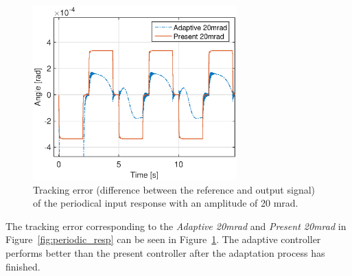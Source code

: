 \begin{figure}[h!]
  \centering
  \includegraphics[width=0.7\textwidth]{fig/matlab/trackingerror.eps}
  \caption{\label{fig:adapt_trackingerror} Tracking error (difference between the reference and output signal) of the periodical input response with an  amplitude of 20 mrad.}
\end{figure}

The tracking error corresponding to the \emph{Adaptive 20mrad} and \emph{Present 20mrad} in Figure~\ref{fig:periodic_resp} can be seen in Figure~\ref{fig:adapt_trackingerror}. The adaptive controller performs better than the present controller after the adaptation process has finished.

